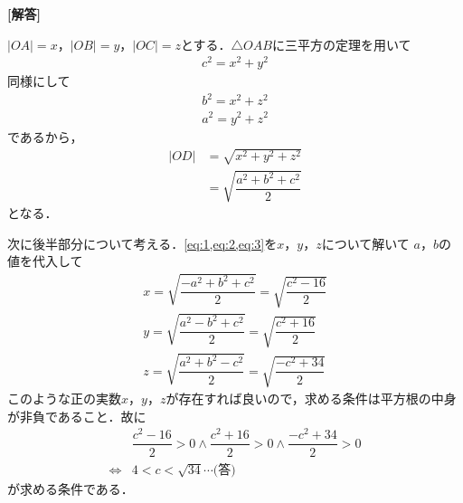 \documentclass[../../main.tex]{subfiles}
\begin{document}
\begin{oframed}
  
\end{oframed}

{\bf [解答]}

$|OA|=x$，$|OB|=y$，$|OC|=z$とする．$\triangle OAB$に三平方の定理を用いて
\begin{align}
  c^2=x^2+y^2　\label{eq:1}
\end{align}
同様にして
\begin{align}
  b^2=x^2+z^2  \label{eq:2}\\
  a^2=y^2+z^2 \label{eq:3}
\end{align}
であるから，
\begin{align}
  |OD|
  &=\sqrt{x^2+y^2+z^2} \\
  &=\sqrt{\dfrac{a^2+b^2+c^2}{2}}
\end{align}
となる．

次に後半部分について考える．\cref{eq:1,eq:2,eq:3}を$x$，$y$，$z$について解いて
$a$，$b$の値を代入して
\begin{align}
  x=\sqrt{\dfrac{-a^2+b^2+c^2}{2}}=\sqrt{\dfrac{c^2-16}{2}} \\
  y=\sqrt{\dfrac{a^2-b^2+c^2}{2}}=\sqrt{\dfrac{c^2+16}{2}} \\
  z=\sqrt{\dfrac{a^2+b^2-c^2}{2}}=\sqrt{\dfrac{-c^2+34}{2}}
\end{align}
このような正の実数$x$，$y$，$z$が存在すれば良いので，求める条件は平方根の中身が非負であること．故に
\begin{align}
  &\dfrac{c^2-16}{2}>0\land\dfrac{c^2+16}{2}>0\land\dfrac{-c^2+34}{2}>0  \\
  \Longleftrightarrow&4<c<\sqrt{34}\cdots\text{(答)}  \tag{$\because c>0$}
\end{align}
が求める条件である．
\newpage
\end{document}
